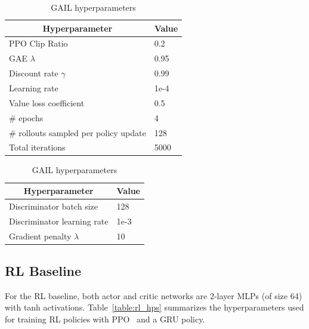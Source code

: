 \documentclass[nohyperref]{article}
\begin{document}
\begin{table}[b]
    \vspace{-1em}
    \begin{minipage}[c]{0.5\textwidth}
    \centering
    \caption{RL hyperparameters}
    \label{table:rl_hps}
        \begin{tabular}{l|l}
        \hline
        \multicolumn{1}{c|}{Hyperparameter}     & \multicolumn{1}{c}{Value} \\ \hline
        PPO Clip Ratio                          & 0.2                       \\
        GAE $\lambda$                           & 0.95                      \\
        Discount rate $\gamma$                  & 0.99                      \\
        Learning rate                           & 1e-4                      \\
        Value loss coefficient                  & 0.5                       \\
        \# epochs                               & 4                         \\
        \# rollouts sampled per policy update   & 128                       \\
        Total iterations                        & 5000                     
        \end{tabular}
    \end{minipage}
    \begin{minipage}[c]{0.5\textwidth}
    \centering
    \caption{GAIL hyperparameters}
    \label{table:gail_hps}
        \begin{tabular}{l|l}
        \hline
        \multicolumn{1}{c|}{Hyperparameter}     & \multicolumn{1}{c}{Value} \\ \hline
        Discriminator batch size                & 128                       \\
        Discriminator learning rate             & 1e-3                      \\
        Gradient penalty $\lambda$              & 10                        \\
        \end{tabular}
    \end{minipage}
\end{table}

\subsection{RL Baseline}
\label{app:rl}
For the RL baseline, both actor and critic networks are 2-layer MLPs (of size 64) with tanh activations. Table~\ref{table:rl_hps} summarizes the hyperparameters used for training RL policies with PPO~\cite{schulman2017proximal} and a GRU policy. 
\end{document}
